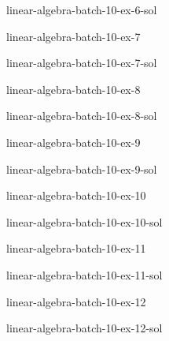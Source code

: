 \documentclass[preview]{standalone}
\begin{document}
\begin{snippetsolution}{linear-algebra-batch-10-ex-6-sol}{}
    \todo
\end{snippetsolution}

\begin{snippetexercise}{linear-algebra-batch-10-ex-7}{}
    \todo
\end{snippetexercise}

\begin{snippetsolution}{linear-algebra-batch-10-ex-7-sol}{}
    \todo
\end{snippetsolution}

\begin{snippetexercise}{linear-algebra-batch-10-ex-8}{}
    \todo
\end{snippetexercise}

\begin{snippetsolution}{linear-algebra-batch-10-ex-8-sol}{}
    \todo
\end{snippetsolution}

\begin{snippetexercise}{linear-algebra-batch-10-ex-9}{}
    \todo
\end{snippetexercise}

\begin{snippetsolution}{linear-algebra-batch-10-ex-9-sol}{}
    \todo
\end{snippetsolution}

\begin{snippetexercise}{linear-algebra-batch-10-ex-10}{}
    \todo
\end{snippetexercise}

\begin{snippetsolution}{linear-algebra-batch-10-ex-10-sol}{}
    \todo
\end{snippetsolution}

\begin{snippetexercise}{linear-algebra-batch-10-ex-11}{}
    \todo
\end{snippetexercise}

\begin{snippetsolution}{linear-algebra-batch-10-ex-11-sol}{}
    \todo
\end{snippetsolution}

\begin{snippetexercise}{linear-algebra-batch-10-ex-12}{}
    \todo
\end{snippetexercise}

\begin{snippetsolution}{linear-algebra-batch-10-ex-12-sol}{}
    \todo
\end{snippetsolution}
\end{document}
